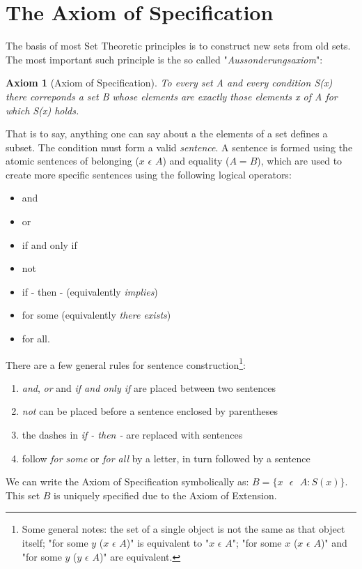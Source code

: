 \documentclass[12pt]{article}
\newtheorem{axiom}{Axiom}
\begin{document}
\section{The Axiom of Specification}
The basis of most Set Theoretic principles is to construct new sets from old sets. The most important such principle
is the so called "\textit{Aussonderungsaxiom}":
\begin{axiom}[Axiom of Specification]
    To every set A and every condition S(x) there correponds a set B whose elements are exactly those
    elements x of A for which S(x) holds.
\end{axiom}
That is to say, anything one can say about a the elements of a set defines a subset. The condition must form a
valid \textit{sentence}. A sentence is formed using the atomic sentences of belonging ($x$ $\epsilon$ $A$)
and equality ($A = B$), which are used to create more specific sentences using the following logical operators:
\begin{itemize}
    \item and
    \item or
    \item if and only if
    \item not
    \item if - then - (equivalently \textit{implies})
    \item for some (equivalently \textit{there exists})
    \item for all.
\end{itemize}
There are a few general rules for sentence construction\footnote{Some general notes: the set of a single object is not the same as that object itself;
"for some $y$ ($x$ $\epsilon$ $A$)" is equivalent to "$x$ $\epsilon$ $A$"; "for some $x$ ($x$ $\epsilon$ $A$)" and
"for some $y$ ($y$ $\epsilon$ $A$)" are equivalent.}:
\begin{enumerate}
    \item \textit{and}, \textit{or} and \textit{if and only if} are placed between two sentences
    \item \textit{not} can be placed before a sentence enclosed by parentheses
    \item the dashes in \textit{if - then - } are replaced with sentences
    \item follow \textit{for some} or \textit{for all} by a letter, in turn followed by a sentence
\end{enumerate}

We can write the Axiom of Specification symbolically as: $B = \{x \text{ }\epsilon \text{ }A: S(x)\}$. This set $B$ is uniquely
specified due to the Axiom of Extension.
\end{document}
